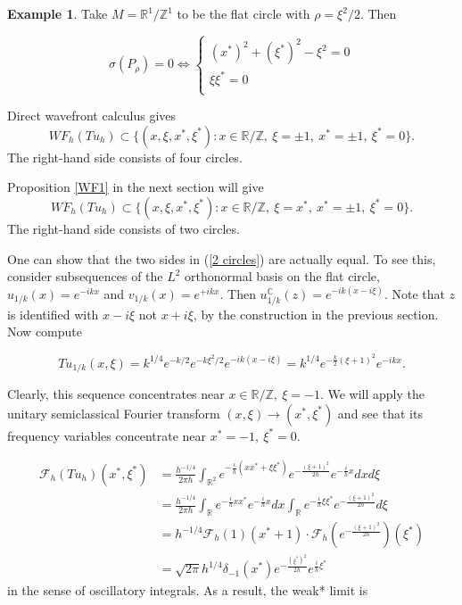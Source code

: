 \documentclass[11pt,reqno]{amsart}
\theoremstyle{definition}
\newtheorem*{Example}{Example}
\begin{document}
\begin{Example}
Take $M=\mathbb{R}^1/\mathbb{Z}^1$ to be the flat circle with $\rho=\xi^2/2$. Then

$$
\sigma(P_{\rho})=0\Longleftrightarrow
\begin{cases}
(x^*)^2+(\xi^*)^2-\xi^2=0\\
\xi \xi^*=0\\    
\end{cases}
$$

Direct wavefront calculus gives
\begin{equation}\label{4 circles}
WF_{h}(Tu_h)\subset\{(x,\xi,x^*,\xi^*):x\in \mathbb{R}/\mathbb{Z},~\xi=\pm1,~x^*=\pm1,~\xi^*=0\}.    
\end{equation}
The right-hand side consists of four circles.

Proposition \ref{WF1} in the next section will give
\begin{equation}\label{2 circles}
WF_{h}(Tu_h)\subset\{(x,\xi,x^*,\xi^*):x\in \mathbb{R}/\mathbb{Z},~\xi=x^*,~x^*=\pm1,~\xi^*=0\}.    
\end{equation}
The right-hand side consists of two circles.

One can show that the two sides in (\ref{2 circles}) are actually equal. To see this, consider subsequences of the $L^2$ orthonormal basis on the flat circle, $u_{1/k}(x)=e^{-ikx}$ and $v_{1/k}(x)=e^{+ikx}$. Then $u^{\mathbb{C}}_{1/k}(z)=e^{-ik(x-i\xi)}$. Note that $z$ is identified with $x-i\xi$ not $x+i\xi$, by the construction in the previous section. Now compute

$$
Tu_{1/k}(x,\xi)=k^{1/4}e^{-k/2}e^{-k\xi^2/2}e^{-ik(x-i\xi)}=k^{1/4}e^{-\frac{k}{2}(\xi+1)^2}e^{-ikx}.
$$

Clearly, this sequence concentrates near $x\in \mathbb{R}/\mathbb{Z},~ \xi=-1$. We will apply the unitary semiclassical Fourier transform $(x,
\xi)\to(x^*,\xi^*)$ and see that its frequency variables concentrate near $x^*=-1,~\xi^*=0$.

\begin{equation*}
    \begin{split}
        \mathcal{F}_h(Tu_h)(x^*,\xi^*)
        &=\frac{h^{-1/4}}{2\pi h}\int_{\mathbb{R}^2}e^{-\frac{i}{h}(xx^*+\xi\xi^*)}e^{-\frac{(\xi+1)^2}{2h}}e^{-\frac{i}{h}x}dxd\xi\\
        &=\frac{h^{-1/4}}{2\pi h}\int_{\mathbb{R}}e^{-\frac{i}{h}xx^*}e^{-\frac{i}{h}x}dx\int_{\mathbb{R}}e^{-\frac{i}{h}\xi\xi^*}e^{-\frac{(\xi+1)^2}{2h}}d\xi\\
        &=h^{-1/4}\mathcal{F}_h(1)(x^*+1)\cdot\mathcal{F}_h(e^{-\frac{(\xi+1)^2}{2h}})(\xi^*)\\
        &=\sqrt{2\pi}h^{1/4}\delta_{-1}(x^*)e^{-\frac{(\xi^*)^2}{2h}}e^{\frac{i}{h}\xi^*}
        \end{split}
\end{equation*}
in the sense of oscillatory integrals. As a result, the weak* limit is


\end{Example}
\end{document}
